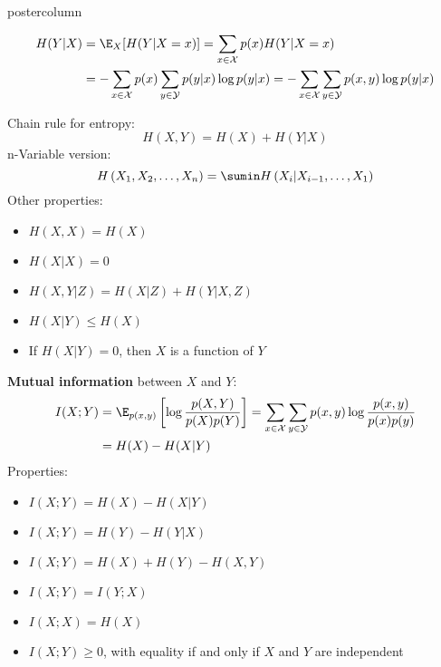 \documentclass{beamer}
\begin{document}
\begin{frame}[fragile]{}
\begin{columns}
\begin{column}{.31\textwidth}
\begin{beamercolorbox}[center]{postercolumn}
\begin{minipage}{.98\textwidth}
{\begin{myblock}{}
\begin{small}
\begin{equation*}
\begin{aligned}
											H(Y | X) &= \E_X[H(Y|X=x)] = \sum_{x \in \Xspace} p(x) H(Y | X=x) \\
											&=-\sum_{x \in \Xspace} p(x) \sum_{y \in \Yspace} p(y | x) \log p(y | x) 
											=-\sum_{x \in \Xspace} \sum_{y \in \Yspace} p(x, y) \log p(y | x)  
										\end{aligned}
									\end{equation*}
								\end{small}  
								Chain rule for entropy:
								$$H(X, Y)=H(X)+H(Y | X)$$
								n-Variable version:
								$$H\left(X_{1}, X_{2}, \ldots, X_{n}\right)=\sumin H\left(X_{i} | X_{i-1}, \ldots, X_{1}\right)$$
								Other properties:
								\begin{itemize}
									\setlength{\itemindent}{+.3in}
										\item $H(X, X)       = H(X)  $
										\item $H(X | X)      = 0 $
										\item $H(X, Y | Z)   =H(X | Z)+H(Y | X, Z)$
										\item $H(X | Y) \leq H(X) $
										\item  If $H(X|Y) = 0$, then $X$ is a function of $Y$
								\end{itemize}
								\textbf{Mutual information} between $X$ and $Y:$
								\begin{equation*}
									\begin{aligned}
										I(X ; Y) &= \E_{p(x, y)} \left[ \log \frac{p(X, Y)}{p(X) p(Y)} \right] = \sum_{x \in \Xspace} \sum_{y \in \Yspace} p(x, y) \log \frac{p(x, y)}{p(x) p(y)} \\
										&= H(X)-H(X | Y)
									\end{aligned}
								\end{equation*}
								Properties:
								\begin{itemize}
									\setlength{\itemindent}{+.3in}
										\item $ I(X ; Y) = H(X) - H(X | Y) $
											\item $I(X ; Y) = H(Y) - H(Y | X) $
											\item $I(X ; Y) = H(X) + H(Y) - H(X, Y)$
											\item $I(X ; Y) = I(Y ; X) $
											\item $I(X ; X) = H(X)$
											\item $ I(X;Y) \geq 0$, with equality if and only if $X$ and $Y$ are independent

\end{itemize}
\end{myblock}}
\end{minipage}
\end{beamercolorbox}
\end{column}
\end{columns}
\end{frame}
\end{document}
